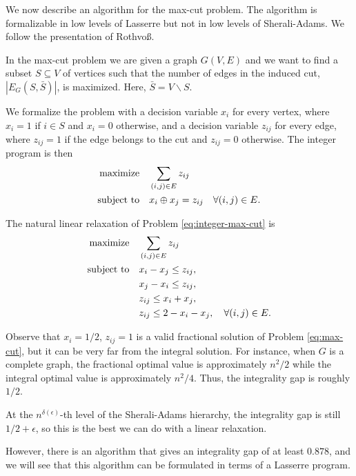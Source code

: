 \documentclass[a4paper,twoside,justified]{tufte-handout}
\begin{document}
We now describe an algorithm for the max-cut problem. The algorithm is formalizable in low levels of Lasserre but not in low levels of Sherali-Adams. We follow the presentation of Rothvoß\cite{lasserresurvey2013}.

In the max-cut problem we are given a graph $G(V,E)$ and we want to find a subset $S\subseteq V$ of vertices such that the number of edges in the induced cut, $|E_G(S,\bar S)|$, is maximized. Here, $\bar S=V\backslash S$.

We formalize the problem with a decision variable $x_i$ for every vertex, where $x_i=1$ if $i\in S$ and $x_i=0$ otherwise, and a decision variable $z_{ij}$ for every edge, where $z_{ij}=1$ if the edge belongs to the cut and $z_{ij}=0$ otherwise. The integer program is then
\begin{alignat}{2}
\label{eq:integer-max-cut}
  \text{maximize}\hspace{1em}& \sum_{(i,j)\in E} z_{ij}\notag \\
  \text{subject to}\hspace{1em}& x_i \oplus x_j = z_{ij} \quad \forall{(i,j)\in E}.
\end{alignat}

The natural linear relaxation of Problem \eqref{eq:integer-max-cut} is
\begin{alignat}{2}
\label{eq:max-cut}
  \text{maximize}\hspace{1em}& \sum_{(i,j)\in E} z_{ij}\notag \\
  \text{subject to}\hspace{1em}& x_i - x_j \leq z_{ij},\notag \\
& x_j - x_i \leq z_{ij},\notag \\
& z_{ij} \leq x_i + x_j,\notag \\
& z_{ij} \leq 2 - x_i - x_j, \quad \forall{(i,j)\in E}.
\end{alignat}

Observe that $x_i=1/2$, $z_{ij}=1$ is a valid fractional solution of Problem \eqref{eq:max-cut}, but it can be very far from the integral solution. For instance, when $G$ is a complete graph, the fractional optimal value is approximately $n^2/2$ while the integral optimal value is approximately $n^2/4$. Thus, the integrality gap is roughly $1/2$.

At the $n^{\delta(\epsilon)}$-th level of the Sherali-Adams hierarchy\cite{charikar2009integrality}, the integrality gap is still $1/2+\epsilon$, so this is the best we can do with a linear relaxation.

 However, there is an algorithm that gives an integrality gap of at least $0.878$, and we will see that this algorithm can be formulated in terms of a Lasserre program\cite{goemans1995improved}.
\end{document}
